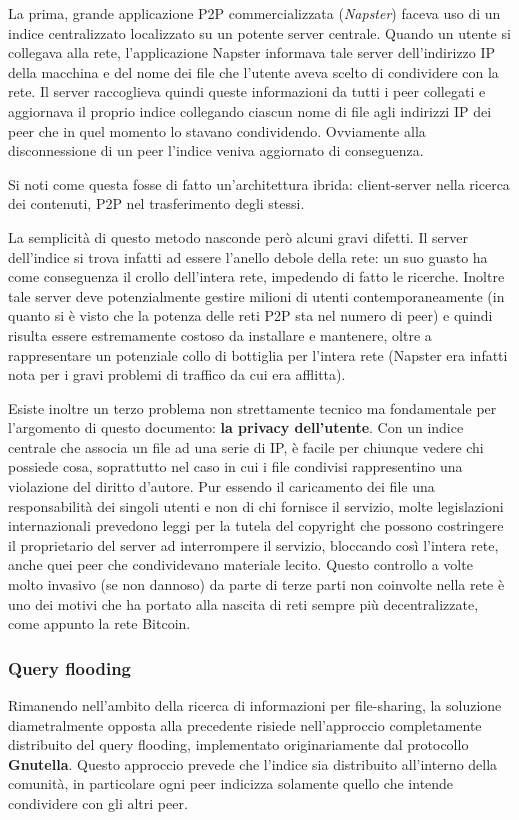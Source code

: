 La prima, grande applicazione P2P commercializzata (\emph{Napster}) faceva uso di un indice centralizzato localizzato su un potente server centrale. Quando un utente si collegava alla rete, l'applicazione Napster informava tale server dell'indirizzo IP della macchina e del nome dei file che l'utente aveva scelto di condividere con la rete. Il server raccoglieva quindi queste informazioni da tutti i peer collegati e aggiornava il proprio indice collegando ciascun nome di file agli indirizzi IP dei peer che in quel momento lo stavano condividendo. Ovviamente alla disconnessione di un peer l'indice veniva aggiornato di conseguenza.

Si noti come questa fosse di fatto un'architettura ibrida: client-server nella ricerca dei contenuti, P2P nel trasferimento degli stessi.

La semplicità di questo metodo nasconde però alcuni gravi difetti. Il server dell'indice si trova infatti ad essere l'anello debole della rete: un suo guasto ha come conseguenza il crollo dell'intera rete, impedendo di fatto le ricerche. Inoltre tale server deve potenzialmente gestire milioni di utenti contemporaneamente (in quanto si è visto che la potenza delle reti P2P sta nel numero di peer) e quindi risulta essere estremamente costoso da installare e mantenere, oltre a rappresentare un potenziale collo di bottiglia per l'intera rete (Napster era infatti nota per i gravi problemi di traffico da cui era afflitta).

Esiste inoltre un terzo problema non strettamente tecnico ma fondamentale per l'argomento di questo documento: \textbf{la privacy dell'utente}. Con un indice centrale che associa un file ad una serie di IP, è facile per chiunque vedere chi possiede cosa, soprattutto nel caso in cui i file condivisi rappresentino una violazione del diritto d'autore. Pur essendo il caricamento dei file una responsabilità dei singoli utenti e non di chi fornisce il servizio, molte legislazioni internazionali prevedono leggi per la tutela del copyright che possono costringere il proprietario del server ad interrompere il servizio, bloccando così l'intera rete, anche quei peer che condividevano materiale lecito. Questo controllo a volte molto invasivo (se non dannoso) da parte di terze parti non coinvolte nella rete è uno dei motivi che ha portato alla nascita di reti sempre più decentralizzate, come appunto la rete Bitcoin.

\subsubsection{Query flooding}\label{query-flooding}
 Rimanendo nell'ambito della ricerca di informazioni per file-sharing, la soluzione diametralmente opposta alla precedente risiede nell'approccio completamente distribuito del query flooding, implementato originariamente dal protocollo \textbf{Gnutella}. Questo approccio prevede che l'indice sia distribuito all'interno della comunità, in particolare ogni peer indicizza solamente quello che intende condividere con gli altri peer.

